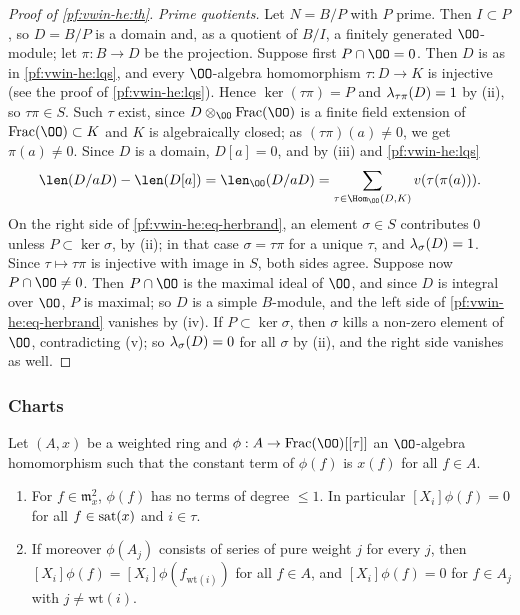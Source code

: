 \begin{proof}[Proof of \cref{pf:vwin-he:th}]
\emph{Prime quotients.} Let $N=B/P$ with $P$ prime. Then $I\subset P$, so $D=B/P$ is a domain and, as a quotient of
$B/I$, a finitely generated $\OO$-module; let $\pi:B\to D$ be the projection. Suppose first $P\cap\OO=0$. Then $D$ is
as in \cref{pf:vwin-he:lqs}, and every $\OO$-algebra homomorphism $\tau:D\to K$ is injective (see the proof of
\cref{pf:vwin-he:lqs}). Hence $\ker(\tau\pi)=P$ and $\lambda_{\tau\pi}(D)=1$ by (ii), so $\tau\pi\in S$. Such
$\tau$ exist, since $D\otimes_\OO\mathrm{Frac}(\OO)$ is a finite field extension of $\mathrm{Frac}(\OO)\subset K$ and
$K$ is algebraically closed; as $(\tau\pi)(a)\ne0$, we get $\pi(a)\ne0$. Since $D$ is a domain, $D[a]=0$, and by (iii)
and \cref{pf:vwin-he:lqs}
\[
 \len(D/aD)-\len(D[a])=\len_\OO(D/aD)=\sum_{\tau\in\Hom_\OO(D,K)}v(\tau(\pi(a))).
\]
On the right side of \eqref{pf:vwin-he:eq-herbrand}, an element $\sigma\in S$ contributes $0$ unless
$P\subset\ker\sigma$, by (ii); in that case $\sigma=\tau\pi$ for a unique $\tau$, and $\lambda_\sigma(D)=1$.
Since $\tau\mapsto\tau\pi$ is injective with image in $S$, both sides agree. Suppose now $P\cap\OO\ne0$. Then
$P\cap\OO$ is the maximal ideal of $\OO$, and since $D$ is integral over $\OO$, $P$ is maximal; so $D$ is a simple
$B$-module, and the left side of \eqref{pf:vwin-he:eq-herbrand} vanishes by (iv). If $P\subset\ker\sigma$, then
$\sigma$ kills a non-zero element of $\OO$, contradicting (v); so $\lambda_\sigma(D)=0$ for all $\sigma$ by
(ii), and the right side vanishes as well.
\end{proof}

\subsubsection{Charts}\label{sec:pf:vwin-he:pf-chart}

\begin{lemma}\label{pf:vwin-he:lin}
Let $(A,x)$ be a weighted ring and $\phi:A\to\mathrm{Frac}(\OO)[[\tau]]$ an $\OO$-algebra homomorphism such that the
constant term of $\phi(f)$ is $x(f)$ for all $f\in A$.
\begin{enumerate}[label=(\alph*)]
\item\label{pf:vwin-he:lin-sat} For $f\in\mathfrak m_x^2$, $\phi(f)$ has no terms of degree $\le1$. In particular
$[X_i]\phi(f)=0$ for all $f\in\operatorname{sat}(x)$ and $i\in\tau$.
\item\label{pf:vwin-he:lin-wt} If moreover $\phi(A_j)$ consists of series of pure weight $j$ for every $j$, then
$[X_i]\phi(f)=[X_i]\phi(f_{\mathrm{wt}(i)})$ for all $f\in A$, and $[X_i]\phi(f)=0$ for $f\in A_j$ with
$j\ne\mathrm{wt}(i)$.
\end{enumerate}
\end{lemma}

